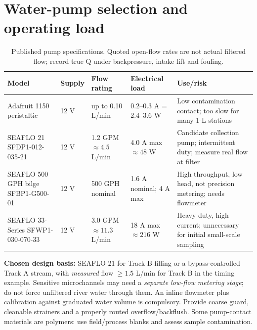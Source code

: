 \documentclass[10pt,a4paper]{article}
\begin{document}
\section{Water-pump selection and operating load}
\begin{table}[H]\centering\scriptsize
\caption{Published pump specifications. Quoted open-flow rates are not actual filtered flow; record true Q under backpressure, intake lift and fouling.}
\begin{tabularx}{\linewidth}{@{}L{2.75cm}L{1.4cm}L{2.0cm}L{1.6cm}Y@{}}\toprule
Model & Supply & Flow rating & Electrical load & Use/risk\\\midrule
Adafruit 1150 peristaltic \cite{Adafruit1150} & 12 V & up to 0.10 L/min & 0.2--0.3 A = 2.4--3.6 W & Low contamination contact; too slow for many 1-L stations\\
SEAFLO 21 SFDP1-012-035-21 \cite{Seaflo21} & 12 V & 1.2 GPM $\approx4.5$ L/min & 4.0 A max $\approx48$ W & Candidate collection pump; intermittent duty; measure real flow at filter\\
SEAFLO 500 GPH bilge SFBP1-G500-01 \cite{SeafloBilge} & 12 V & 500 GPH nominal & 1.6 A nominal; 4 A max & High throughput, low head, not precision metering; needs flowmeter\\
SEAFLO 33-Series SFWP1-030-070-33 \cite{Seaflo33} & 12 V & 3.0 GPM $\approx11.3$ L/min & 18 A max $\approx216$ W & Heavy duty, high current; unnecessary for initial small-scale sampling\\\bottomrule\end{tabularx}\end{table}
\textbf{Chosen design basis:} SEAFLO 21 for Track B filling or a bypass-controlled Track A stream, with \emph{measured} flow $\geq1.5$ L/min for Track B in the timing example. Sensitive microchannels may need a \emph{separate low-flow metering stage}; do not force unfiltered river water through them. An inline flowmeter plus calibration against graduated water volume is compulsory. Provide coarse guard, cleanable strainers and a properly routed overflow/backflush. Some pump-contact materials are polymers: use field/process blanks and assess sample contamination.
\end{document}
